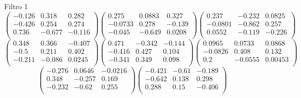 Filtro 1
{ \small
\[
\begin{pmatrix}
  -0.126 & 0.318 & 0.282 \\
  -0.426 & 0.254 & 0.274 \\
  0.736 & -0.677 & -0.116 \\
\end{pmatrix}
\begin{pmatrix}
  0.275 & 0.0883 & 0.327 \\
  -0.0733 & 0.278 & -0.139 \\
  -0.045 & -0.649 & 0.0208 \\
\end{pmatrix}
\begin{pmatrix}
  0.237 & -0.232 & 0.0825 \\
  -0.0801 & -0.862 & 0.257 \\
  0.0552 & -0.119 & -0.226 \\
\end{pmatrix}
\]
\[
\begin{pmatrix}
  0.348 & 0.366 & -0.407 \\
  -0.5 & 0.211 & 0.402 \\
  -0.211 & -0.086 & 0.0245 \\
\end{pmatrix}
\begin{pmatrix}
  0.471 & -0.342 & -0.144 \\
  -0.416 & 0.427 & 0.104 \\
  -0.341 & 0.349 & 0.098 \\
\end{pmatrix}
\begin{pmatrix}
  0.0965 & 0.0733 & 0.0868 \\
  -0.0826 & 0.408 & 0.132 \\
  0.2 & -0.0555 & 0.00453 \\
\end{pmatrix}
\]
\[
\begin{pmatrix}
  -0.276 & 0.0646 & -0.0216 \\
  0.348 & -0.257 & 0.169 \\
  -0.232 & -0.62 & 0.255 \\
\end{pmatrix}
\begin{pmatrix}
  -0.421 & -0.61 & -0.189 \\
  -0.642 & 0.138 & 0.298 \\
  0.288 & 0.15 & -0.406 \\
\end{pmatrix}
\]
}

